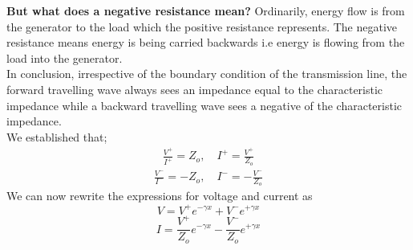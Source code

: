 \textbf{But what does a negative resistance mean?}
Ordinarily, energy flow is from the generator to the load which the positive resistance represents. The negative resistance means energy is being carried backwards i.e energy is flowing from the load into the generator.\\

In conclusion, irrespective of the boundary condition of the transmission line, the forward travelling wave always sees an impedance equal to the characteristic impedance while a backward travelling wave sees a negative of the characteristic impedance.\\

We established that;
\begin{align*}
\frac{V^+}{I^+} = Z_o,\quad I^+ = \frac{V^+}{Z_o}
\end{align*}
\begin{align*}
\frac{V^-}{I^-} = -Z_o,\quad I^- = -\frac{V^-}{Z_o}
\end{align*}
We can now rewrite the expressions for voltage and current as
\begin{equation}
V = V^+e^{-\gamma x}+V^-e^{+\gamma x}
\label{eqn:voltage}
\end{equation}
\begin{equation}
I = \frac{V^+}{Z_o}e^{-\gamma x}-\frac{V^-}{Z_o}e^{+\gamma x}
\label{eqn:current}
\end{equation}


